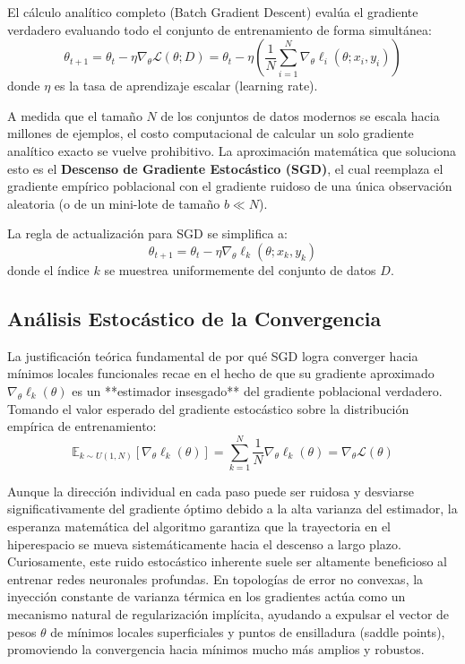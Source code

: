 \documentclass[12pt]{article}
\begin{document}
El cálculo analítico completo (Batch Gradient Descent) evalúa el gradiente verdadero evaluando todo el conjunto de entrenamiento de forma simultánea:
\begin{equation}
    \theta_{t+1} = \theta_t - \eta \nabla_\theta \mathcal{L}(\theta; D) = \theta_t - \eta \left( \frac{1}{N} \sum_{i=1}^{N} \nabla_\theta \ell_i(\theta; x_i, y_i) \right)
\end{equation}
donde $\eta$ es la tasa de aprendizaje escalar (learning rate).

A medida que el tamaño $N$ de los conjuntos de datos modernos se escala hacia millones de ejemplos, el costo computacional de calcular un solo gradiente analítico exacto se vuelve prohibitivo. 
La aproximación matemática que soluciona esto es el \textbf{Descenso de Gradiente Estocástico (SGD)}, el cual reemplaza el gradiente empírico poblacional con el gradiente ruidoso de una única observación aleatoria (o de un mini-lote de tamaño $b \ll N$).

La regla de actualización para SGD se simplifica a:
\begin{equation}
    \theta_{t+1} = \theta_t - \eta \nabla_\theta \ell_k(\theta; x_k, y_k)
\end{equation}
donde el índice $k$ se muestrea uniformemente del conjunto de datos $D$.

\subsection*{Análisis Estocástico de la Convergencia}
La justificación teórica fundamental de por qué SGD logra converger hacia mínimos locales funcionales recae en el hecho de que su gradiente aproximado $\nabla_\theta \ell_k(\theta)$ es un **estimador insesgado** del gradiente poblacional verdadero.
Tomando el valor esperado del gradiente estocástico sobre la distribución empírica de entrenamiento:
\begin{equation}
    \mathbb{E}_{k \sim U(1, N)} [ \nabla_\theta \ell_k(\theta) ] = \sum_{k=1}^{N} \frac{1}{N} \nabla_\theta \ell_k(\theta) = \nabla_\theta \mathcal{L}(\theta)
\end{equation}

Aunque la dirección individual en cada paso puede ser ruidosa y desviarse significativamente del gradiente óptimo debido a la alta varianza del estimador, la esperanza matemática del algoritmo garantiza que la trayectoria en el hiperespacio se mueva sistemáticamente hacia el descenso a largo plazo. Curiosamente, este ruido estocástico inherente suele ser altamente beneficioso al entrenar redes neuronales profundas. En topologías de error no convexas, la inyección constante de varianza térmica en los gradientes actúa como un mecanismo natural de regularización implícita, ayudando a expulsar el vector de pesos $\theta$ de mínimos locales superficiales y puntos de ensilladura (saddle points), promoviendo la convergencia hacia mínimos mucho más amplios y robustos.
\end{document}
